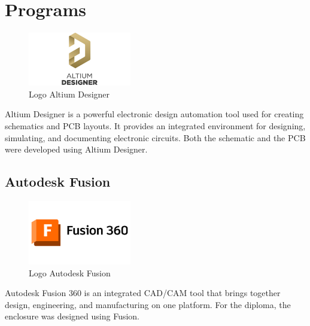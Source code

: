 \section{Programs}

\begin{figure}[H]
\centering
\includegraphics[width=0.4\textwidth]{assets/Altium Designer.png}
\caption{Logo Altium Designer}
\end{figure}

Altium Designer is a powerful electronic design automation tool used for creating schematics and PCB layouts. It provides an integrated environment for designing, simulating, and documenting electronic circuits. Both the schematic and the PCB were developed using Altium Designer.

\subsection{Autodesk Fusion}

\begin{figure}[H]
\centering
\includegraphics[width=0.4\textwidth]{assets/Autodesk Fusion.png}
\caption{Logo Autodesk Fusion}
\end{figure}

Autodesk Fusion 360 is an integrated CAD/CAM tool that brings together design, engineering, and manufacturing on one platform. For the diploma, the enclosure was designed using Fusion.